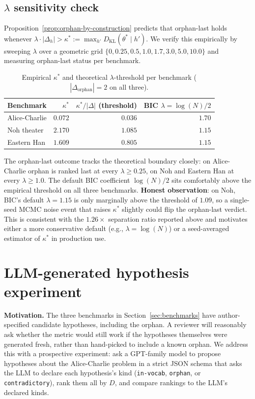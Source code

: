 \documentclass{article}
\begin{document}
\subsection{$\lambda$ sensitivity check}
\label{sec:lambda-sensitivity}

Proposition~\ref{prop:orphan-by-construction} predicts that orphan-last
holds whenever $\lambda \cdot |\Delta_{h}| > \kappa^{*} :=
\max_{h'} D_{\mathrm{KL}}(\theta^{*} \mid h')$. We verify this
empirically by sweeping $\lambda$ over a geometric grid
$\{0, 0.25, 0.5, 1.0, 1.7, 3.0, 5.0, 10.0\}$ and measuring orphan-last
status per benchmark.

\begin{table}[h]
\centering
\caption{Empirical $\kappa^{*}$ and theoretical $\lambda$-threshold
per benchmark ($|\Delta_{\mathrm{orphan}}| = 2$ on all three).}
\label{tab:kappa-star}
\small
\begin{tabular}{lrrr}
\toprule
Benchmark       & $\kappa^{*}$ & $\kappa^{*}/|\Delta|$ (threshold) & BIC $\lambda = \log(N)/2$ \\
\midrule
Alice-Charlie   & $0.072$ & $0.036$ & $1.70$ \\
Noh theater     & $2.170$ & $1.085$ & $1.15$ \\
Eastern Han     & $1.609$ & $0.805$ & $1.15$ \\
\bottomrule
\end{tabular}
\end{table}

The orphan-last outcome tracks the theoretical boundary closely: on
Alice-Charlie orphan is ranked last at every $\lambda \geq 0.25$, on
Noh and Eastern Han at every $\lambda \geq 1.0$. The default BIC
coefficient $\log(N)/2$ sits comfortably above the empirical
threshold on all three benchmarks. \textbf{Honest observation}: on
Noh, BIC's default $\lambda = 1.15$ is only marginally above the
threshold of $1.09$, so a single-seed MCMC noise event that raises
$\kappa^{*}$ slightly could flip the orphan-last verdict. This is
consistent with the $1.26\times$ separation ratio reported above and
motivates either a more conservative default (e.g.,
$\lambda = \log(N)$) or a seed-averaged estimator of $\kappa^{*}$
in production use.

\section{LLM-generated hypothesis experiment}
\label{sec:llmgen}

\textbf{Motivation.} The three benchmarks in Section~\ref{sec:benchmarks}
have author-specified candidate hypotheses, including the orphan. A
reviewer will reasonably ask whether the metric would still work if
the hypotheses themselves were generated fresh, rather than
hand-picked to include a known orphan. We address this with a
prospective experiment: ask a GPT-family model to propose hypotheses
about the Alice-Charlie problem in a strict JSON schema that asks
the LLM to declare each hypothesis's kind (\texttt{in-vocab},
\texttt{orphan}, or \texttt{contradictory}), rank them all by $D$,
and compare rankings to the LLM's declared kinds.
\end{document}
